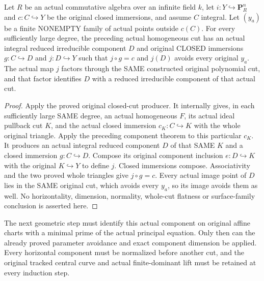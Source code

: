 \begin{corollary}
\label{cor:pl-gauss-original-cut-integral-component}
\leanok
Let $R$ be an actual commutative algebra over an infinite field $k$,
let $i:Y\hookrightarrow\mathbf P^n_R$ and $c:C\hookrightarrow Y$
be the original closed immersions, and assume $C$ integral. Let
$(y_a)$ be a finite NONEMPTY family of actual points outside $c(C)$.
For every sufficiently large degree, the preceding actual homogeneous
cut has an actual integral reduced irreducible component $D$ and
original CLOSED immersions $g:C\hookrightarrow D$ and
$j:D\hookrightarrow Y$ such that $j\circ g=c$ and $j(D)$ avoids
every original $y_a$. The actual map $j$ factors through the SAME
constructed original polynomial cut, and that factor identifies $D$
with a reduced irreducible component of that actual cut.
\end{corollary}
\begin{proof}
Apply the proved original closed-cut producer. It internally gives,
in each sufficiently large SAME degree, an actual homogeneous $F$,
its actual ideal pullback cut $K$, and the actual closed immersion
$c_K:C\hookrightarrow K$ with the whole original triangle. Apply
the preceding component theorem to this particular $c_K$. It produces
an actual integral reduced component $D$ of that SAME $K$ and a closed
immersion $g:C\hookrightarrow D$. Compose its original component
inclusion $e:D\hookrightarrow K$ with the original $K\hookrightarrow Y$
to define $j$. Closed immersions compose. Associativity and the two
proved whole triangles give $j\circ g=c$. Every actual image point
of $D$ lies in the SAME original cut, which avoids every $y_a$, so
its image avoids them as well. No horizontality, dimension, normality,
whole-cut flatness or surface-family conclusion is asserted here.
\end{proof}

The next geometric step must identify this actual component on original
affine charts with a minimal prime of the actual principal equation.
Only then can the already proved parameter avoidance and exact component
dimension be applied. Every horizontal component must be normalized
before another cut, and the original tracked central curve and actual
finite-dominant lift must be retained at every induction step.
